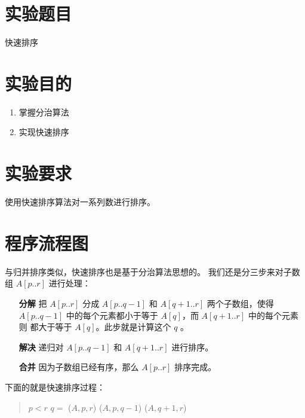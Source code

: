 \documentclass[cs4size,a4paper,nofonts]{ctexart}
\begin{document}
\newpage

\section{实验题目}
快速排序
\section{实验目的}
\begin{enumerate}[topsep=0pt,partopsep=0pt,itemsep=0pt,parsep=0pt]
\item 掌握分治算法
\item 实现快速排序
\end{enumerate}
\section{实验要求}
使用快速排序算法对一系列数进行排序。

\begin{quote}

\end{quote}

\section{程序流程图}

与归并排序类似，快速排序也是基于分治算法思想的。
我们还是分三步来对子数组 $A[p..r]$ 进行处理：

\begin{enumerate}[topsep=0pt,partopsep=0pt,itemsep=0pt,parsep=0pt]
\item[\bf 分解] 把 $A[p..r]$ 分成 $A[p..q - 1]$ 和 $A[q + 1..r]$ 两个子数组，使得
$A[p.. q - 1]$ 中的每个元素都小于等于 $A[q]$，而 $A[q + 1..r]$ 中的每个元素则
都大于等于 $A[q]$。此步就是计算这个 $q$ 。
\item[\bf 解决] 递归对 $A[p..q-1]$ 和 $A[q+1..r]$ 进行排序。
\item[\bf 合并]  因为子数组已经有序，那么 $A[p..r]$ 排序完成。
\end{enumerate}

下面的就是快速排序过程：
\begin{quote}
\begin{codebox}
\li \If $p < r$ \Then
\li   $q =$ ($A, p, r$)
\li   {}($A, p, q - 1$)
\li   {}($A, q + 1, r$)
    \End
\end{codebox}
\end{quote}
\end{document}
